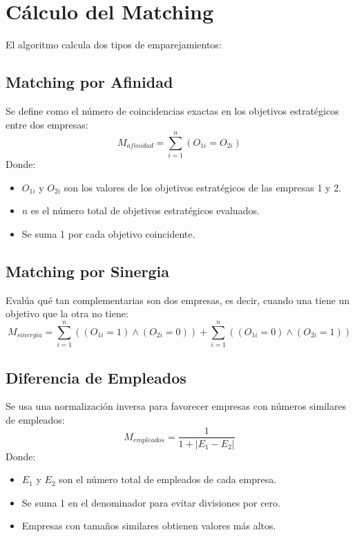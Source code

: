 \documentclass[a4paper,12pt]{article}
\begin{document}
\section{Cálculo del Matching}
El algoritmo calcula dos tipos de emparejamientos:

\subsection{Matching por Afinidad}
Se define como el número de coincidencias exactas en los objetivos estratégicos entre dos empresas:
\begin{equation}
M_{afinidad} = \sum_{i=1}^{n} (O_{1i} = O_{2i})
\end{equation}
Donde:
\begin{itemize}
    \item $O_{1i}$ y $O_{2i}$ son los valores de los objetivos estratégicos de las empresas 1 y 2.
    \item $n$ es el número total de objetivos estratégicos evaluados.
    \item Se suma 1 por cada objetivo coincidente.
\end{itemize}

\subsection{Matching por Sinergia}
Evalúa qué tan complementarias son dos empresas, es decir, cuando una tiene un objetivo que la otra no tiene:
\begin{equation}
M_{sinergia} = \sum_{i=1}^{n} ((O_{1i} = 1) \land (O_{2i} = 0)) + \sum_{i=1}^{n} ((O_{1i} = 0) \land (O_{2i} = 1))
\end{equation}

\subsection{Diferencia de Empleados}
Se usa una normalización inversa para favorecer empresas con números similares de empleados:
\begin{equation}
M_{empleados} = \frac{1}{1 + |E_1 - E_2|}
\end{equation}
Donde:
\begin{itemize}
    \item $E_1$ y $E_2$ son el número total de empleados de cada empresa.
    \item Se suma 1 en el denominador para evitar divisiones por cero.
    \item Empresas con tamaños similares obtienen valores más altos.
\end{itemize}
\end{document}
